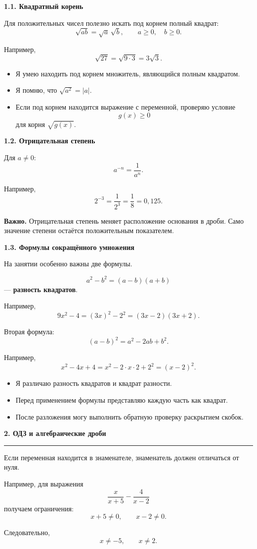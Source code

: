 \documentclass[a4paper,12pt]{article}
\newcommand{\topic}[1]{%
  \vspace{0.4em}
  {\Large\bfseries\color{darkaccent}#1\par}
  \vspace{0.25em}
  {\color{accent}\rule{\linewidth}{0.7pt}}
  \vspace{0.45em}
}
\newcommand{\subtopic}[1]{%
  \vspace{0.5em}
  {\large\bfseries\color{darkaccent}#1\par}
  \vspace{0.2em}
}
\newcommand{\important}[1]{%
  \par\vspace{0.3em}
  {\color{darkaccent}\bfseries Важно.} #1
  \par\vspace{0.3em}
}
\newcommand{\checkliststart}{%
  \begin{itemize}[label={\(\square\)},leftmargin=8mm]
}
\newcommand{\checklistend}{\end{itemize}}
\begin{document}
\subtopic{1.1. Квадратный корень}

Для положительных чисел полезно искать под корнем полный квадрат:
\[
\sqrt{ab}=\sqrt a\,\sqrt b,
\qquad a\ge0,\quad b\ge0.
\]

Например,
\[
\sqrt{27}
=
\sqrt{9\cdot3}
=
3\sqrt3.
\]

\checkliststart
\item Я умею находить под корнем множитель, являющийся полным квадратом.
\item Я помню, что \(\sqrt{a^2}=|a|\).
\item Если под корнем находится выражение с переменной, проверяю условие
\[
g(x)\ge0
\]
для корня \(\sqrt{g(x)}\).
\checklistend

\subtopic{1.2. Отрицательная степень}

Для \(a\ne0\):
\[
a^{-n}=\frac{1}{a^n}.
\]

Например,
\[
2^{-3}
=
\frac1{2^3}
=
\frac18
=
0{,}125.
\]

\important{Отрицательная степень меняет расположение основания в дроби. Само значение степени остаётся положительным показателем.}

\subtopic{1.3. Формулы сокращённого умножения}

На занятии особенно важны две формулы.

\[
a^2-b^2=(a-b)(a+b)
\]
--- \textbf{разность квадратов}.

Например,
\[
9x^2-4
=
(3x)^2-2^2
=
(3x-2)(3x+2).
\]

Вторая формула:
\[
(a-b)^2=a^2-2ab+b^2.
\]

Например,
\[
x^2-4x+4
=
x^2-2\cdot x\cdot2+2^2
=
(x-2)^2.
\]

\checkliststart
\item Я различаю разность квадратов и квадрат разности.
\item Перед применением формулы представляю каждую часть как квадрат.
\item После разложения могу выполнить обратную проверку раскрытием скобок.
\checklistend

\topic{2. ОДЗ и алгебраические дроби}

Если переменная находится в знаменателе, знаменатель должен отличаться от нуля.

Например, для выражения
\[
\frac{x}{x+5}-\frac4{x-2}
\]
получаем ограничения:
\[
x+5\ne0,
\qquad
x-2\ne0.
\]

Следовательно,
\[
\boxed{x\ne-5,\qquad x\ne2}.
\]
\end{document}
